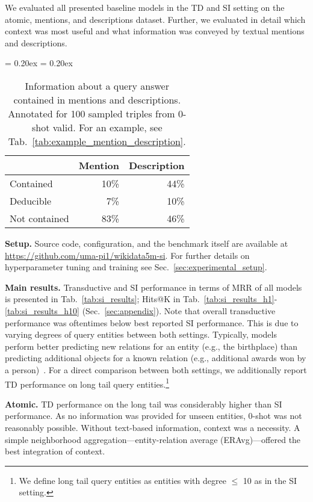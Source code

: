 \documentclass[11pt]{article}
\renewcommand\:{\colon} \newcommand{\sset}[1]{\left\{\,#1\,\right\}} \newcommand{\ssets}[1]{\left\{#1\right\}} \newcommand{\ssetn}[1]{\{\,#1\,\}}
\begin{document}
We evaluated all presented baseline models in the TD and SI setting on the atomic, mentions, and descriptions dataset.
Further, we evaluated in detail which context was most useful and what information was conveyed by textual mentions and descriptions.


\begin{table}[ht]
  \centering
  \resizebox{0.9\columnwidth}{!}
  {
  \aboverulesep = 0.20ex
  \belowrulesep = 0.20ex
  \begin{tabular}{lrr}
    \toprule
    & \textbf{Mention} & \textbf{Description} \\
    \midrule
    Contained & 10\% & 44\% \\
    Deducible & 7\% & 10\% \\
    Not contained & 83\% & 46\% \\
    \bottomrule
  \end{tabular}
  }
  \caption{
    Information about a query answer contained in mentions and descriptions.
    Annotated for 100 sampled triples from 0-shot valid.
    For an example, see Tab.~\ref{tab:example_mention_description}.
  }
  \label{tab:text_information}
\end{table}



\textbf{Setup.}
Source code, configuration, and the benchmark itself are available at \url{https://github.com/uma-pi1/wikidata5m-si}.
For further details on hyperparameter tuning and training see Sec.~\ref{sec:experimental_setup}.



\textbf{Main results.}
Transductive and SI performance in terms of MRR of all models is presented in Tab.~\ref{tab:si_results};
Hits@K  in Tab.~\ref{tab:si_results_h1}-\ref{tab:si_results_h10} (Sec.~\ref{sec:appendix}).
Note that overall transductive performance was oftentimes below best reported SI performance.
This is due to varying degrees of query entities between both settings.
Typically, models perform better predicting new relations for an entity (e.g., the birthplace) than predicting additional objects for a known relation (e.g., additional awards won by a person)~\cite{saxena2022sequence,kochsiek2023friendly}.
For a direct comparison between both settings, we additionally report TD performance on long tail query entities.\footnote{We define long tail query entities as entities with degree $\leq$ 10 as in the SI setting.}

\textbf{Atomic.}
TD performance on the long tail was considerably higher than SI performance.
As no information was provided for unseen entities, 0-shot was not reasonably possible.
Without text-based information, context was a necessity.
A simple neighborhood aggregation---entity-relation average (ERAvg)---offered the best integration of context.
\end{document}
